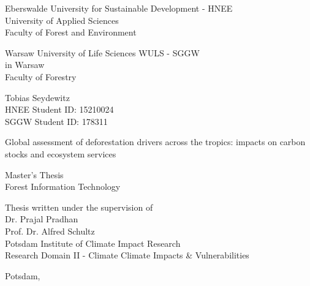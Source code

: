 \begin{titlepage}
	\begin{singlespace}
		\begin{center}
			\Large{Eberswalde University for Sustainable Development - HNEE}\\
			\Large{University of Applied Sciences}\\
			\Large{Faculty of Forest and Environment}
			
			\smallskip

			\Large{Warsaw University of Life Sciences WULS - SGGW}\\
			\Large{in Warsaw}\\
			\Large{Faculty of Forestry}

			\bigskip

			\large{Tobias Seydewitz}\\
			\normalsize{HNEE Student ID: 15210024}\\
			\normalsize{SGGW Student ID: 178311}

			\vspace{2cm}
 
			 \huge{Global assessment of deforestation drivers across the tropics: impacts on carbon stocks and ecosystem services}

			\bigskip

			\large{Master's Thesis}\\
			\large{Forest Information Technology}

			\vspace{2cm}

			\begin{flushright}
				\normalsize{Thesis written under the supervision of}\\
				\normalsize{Dr. Prajal Pradhan}\\
				\normalsize{Prof. Dr. Alfred Schultz}\\
				\normalsize{Potsdam Institute of Climate Impact Research}\\
				\normalsize{Research Domain II - Climate Climate Impacts \& Vulnerabilities}
			\end{flushright}

			\vspace{5cm}

			\normalsize{Potsdam, \the\year}
		\end{center}
	\end{singlespace}
\end{titlepage}
